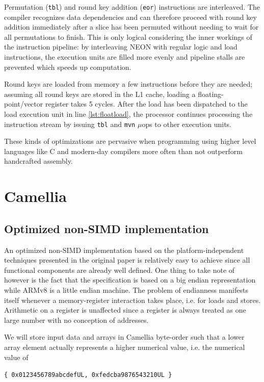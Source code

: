 Permutation (\texttt{tbl}) and round key addition (\texttt{eor}) instructions
are interleaved. The compiler recognizes data dependencies and can therefore
proceed with round key addition immediately after a slice has been permuted
without needing to wait for all permutations to finish. This is only logical
considering the inner workings of the instruction pipeline: by interleaving
NEON with regular logic and load instructions, the execution units are filled
more evenly and pipeline stalls are prevented which speeds up computation.

Round keys are loaded from memory a few instructions before they are needed;
assuming all round keys are stored in the L1 cache, loading a
floating-point/vector register takes 5 cycles. After the load has been
dispatched to the load execution unit in line \ref{lst:floatload}, the
processor continues processing the instruction stream by issuing \texttt{tbl}
and \texttt{mvn} $\mu$ops to other execution units.

These kinds of optimizations are pervasive when programming using higher level
languages like C and modern-day compilers more often than not outperform
handcrafted assembly.

\section{Camellia}
\subsection{Optimized non-SIMD implementation}

An optimized non-SIMD implementation based on the platform-independent
techniques presented in the original paper is relatively easy to achieve since
all functional components are already well defined. One thing to take note of
however is the fact that the specification is based on a big endian
representation while ARMv8 is a little endian machine. The problem of
endianness manifests itself whenever a memory-register interaction takes place,
i.e. for loads and stores. Arithmetic on a register is unaffected since a
register is always treated as one large number with no conception of addresses.

We will store input data and arrays in Camellia byte-order such that a lower
array element actually represents a higher numerical value, i.e. the numerical
value of

\begin{center}
    \texttt{\{ 0x0123456789abcdefUL, 0xfedcba9876543210UL \}}
\end{center}

